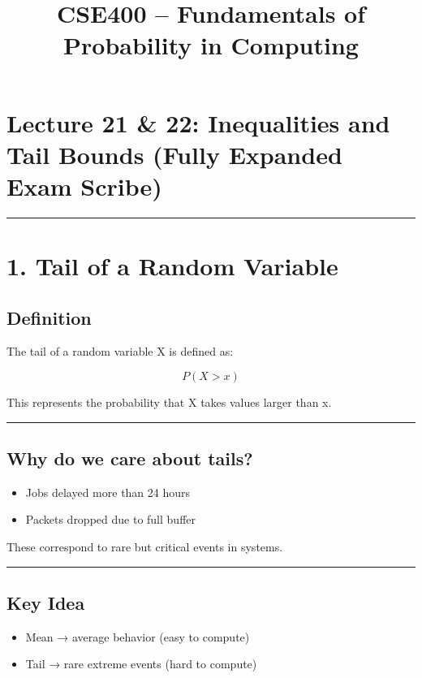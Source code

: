 \documentclass[12pt]{article}
\title{CSE400 – Fundamentals of Probability in Computing}
\date{}
\begin{document}
\maketitle

\section*{Lecture 21 \& 22: Inequalities and Tail Bounds (Fully Expanded Exam Scribe)}

\hrule
\vspace{10pt}

\section*{1. Tail of a Random Variable}

\subsection*{Definition}

The tail of a random variable X is defined as:

\[
P(X > x)
\]

This represents the probability that X takes values larger than x.

\hrule

\subsection*{Why do we care about tails?}

\begin{itemize}
\item Jobs delayed more than 24 hours
\item Packets dropped due to full buffer
\end{itemize}

These correspond to rare but critical events in systems.

\hrule

\subsection*{Key Idea}

\begin{itemize}
\item Mean → average behavior (easy to compute)
\item Tail → rare extreme events (hard to compute)
\end{itemize}
\end{document}
